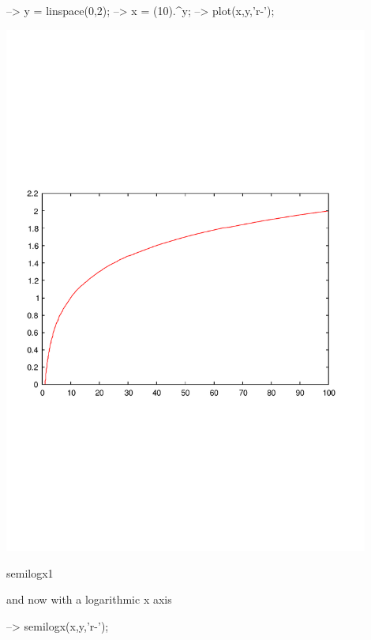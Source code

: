\begin{DoxyVerbInclude}
--> y = linspace(0,2);
--> x = (10).^y;
--> plot(x,y,'r-');
\end{DoxyVerbInclude}


 
\begin{DoxyImage}
\includegraphics[width=12cm]{semilogx1}
\caption{semilogx1}
\end{DoxyImage}
 and now with a logarithmic x axis


\begin{DoxyVerbInclude}
--> semilogx(x,y,'r-');
\end{DoxyVerbInclude}


